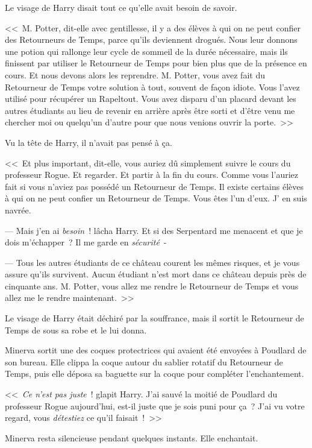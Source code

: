 Le visage de Harry disait tout ce qu'elle avait besoin de savoir.

<<~M. Potter, dit-elle avec gentillesse, il y a des élèves à qui on ne peut confier des Retourneurs de Temps, parce qu'ils deviennent drogués. Nous leur donnons une potion qui rallonge leur cycle de sommeil de la durée nécessaire, mais ils finissent par utiliser le Retourneur de Temps pour bien plus que de la présence en cours. Et nous devons alors les reprendre. M. Potter, vous avez fait du Retourneur de Temps votre solution à tout, souvent de façon idiote. Vous l'avez utilisé pour récupérer un Rapeltout. Vous avez disparu d'un placard devant les autres étudiants au lieu de revenir en arrière après être sorti et d'être venu me chercher moi ou quelqu'un d'autre pour que nous venions ouvrir la porte.~>>

Vu la tête de Harry, il n'avait pas pensé à ça.

<<~Et plus important, dit-elle, vous auriez dû simplement suivre le cours du professeur Rogue. Et regarder. Et partir à la fin du cours. Comme vous l'auriez fait si vous n'aviez pas possédé un Retourneur de Temps. Il existe certains élèves à qui on ne peut confier un Retourneur de Temps. Vous êtes l'un d'eux. J' en suis navrée.

--- Mais j'en ai \emph{besoin}~! lâcha Harry. Et si des Serpentard me menacent et que je dois m'échapper~? Il me garde en \emph{sécurité}~-

--- Tous les autres étudiants de ce château courent les mêmes risques, et je vous assure qu'ils survivent. Aucun étudiant n'est mort dans ce château depuis près de cinquante ans. M. Potter, vous allez me rendre le Retourneur de Temps et vous allez me le rendre maintenant.~>>

Le visage de Harry était déchiré par la souffrance, mais il sortit le Retourneur de Temps de sous sa robe et le lui donna.

Minerva sortit une des coques protectrices qui avaient été envoyées à Poudlard de son bureau. Elle clippa la coque autour du sablier rotatif du Retourneur de Temps, puis elle déposa sa baguette sur la coque pour compléter l'enchantement.

<<~\emph{Ce n'est pas juste}~! glapit Harry. J'ai sauvé la moitié de Poudlard du professeur Rogue aujourd'hui, est-il juste que je sois puni pour ça~? J'ai vu votre regard, vous \emph{détestiez} ce qu'il faisait~!~>>

Minerva resta silencieuse pendant quelques instants. Elle enchantait.

